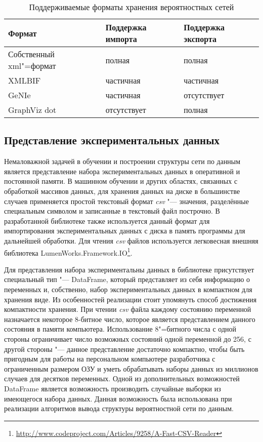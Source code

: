 \begin{table}[ht]
\caption{Поддерживаемые форматы хранения вероятностных сетей}
\label{table:arch_and_mod:net_persistence:supported_formats}
\centering
  \begin{tabular}{| >{\raggedright}m{}
                  | >{\centering}m{}
                  | >{\centering\arraybackslash}m{}|}
  \hline Формат & Поддержка импорта & Поддержка экспорта \\
  \hline Собственный xml"=формат & полная & полная \\
  \hline XMLBIF & частичная & частичная \\
  \hline GeNIe & частичная & отсутствует \\
  \hline GraphViz dot & отсутствует & полная \\
  \hline
  \end{tabular}
\end{table}



\subsection{Представление экспериментальных данных}
\label{sub:arch_and_mod:dataframe}

Немаловажной задачей в обучении и построении структуры сети по данным является представление набора экспериментальных данных в оперативной и постоянной памяти.
В машинном обучении и других областях, связанных с обработкой массивов данных, для хранения данных на диске в большинстве случаев применяется простой текстовый формат \emph{csv} "--- значения, разделённые специальным символом и записанные в текстовый файл построчно.
В разработанной библиотеке также используется данный формат для импортирования экспериментальных данных с диска в память программы для дальнейшей обработки.
Для чтения \emph{csv} файлов используется легковесная внешняя библиотека LumenWorks.Framework.IO\footnote{\url{http://www.codeproject.com/Articles/9258/A-Fast-CSV-Reader}}.

Для представления набора экспериментальны данных в библиотеке присутствует специальный тип "--- DataFrame, который представляет из себя информацию о переменных и, собственно, набор экспериментальных данных в компактном для хранения виде.
Из особенностей реализации стоит упомянуть способ достижения компактности хранения.
При чтении \emph{csv} файла каждому состоянию переменной назначается некоторое 8-битное число, которое является представлением данного состояния в памяти компьютера.
Использование 8"=битного числа с одной стороны ограничивает число возможных состояний одной переменной до \num{256}, с другой стороны "--- данное представление достаточно компактно, чтобы быть пригодным для работы на персональном компьютере разработчика с ограниченным размером ОЗУ и уметь обрабатывать наборы данных из миллионов случаев для десятков переменных.
Одной из дополнительных возможностей DataFrame является возможность производить случайные выборки из имеющегося набора данных.
Данная возможность была использована при реализации алгоритмов вывода структуры вероятностной сети по данным.


